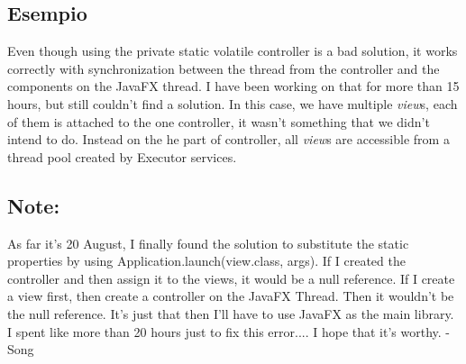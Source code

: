 \documentclass[a4paper,12pt]{report}
\begin{document}
\subsection*{Esempio}

Even though using the private static volatile controller is a bad solution, it works correctly with synchronization between the thread from the controller and the components on the JavaFX thread. 
I have been working on that for more than 15 hours, but still couldn't find a solution. In this case, we have multiple \textit{view}s, each of them is attached to the one controller, it wasn't something that we didn't intend to do.
Instead on the he part of controller, all \textit{view}s are accessible from a thread pool created by Executor services. 

\subsection*{Note:}
As far it's 20 August, I finally found the solution to substitute the static properties by using Application.launch(view.class, args). If I created the controller and then assign it to the views, it would be a null reference. If I create a view first, then create a controller on the JavaFX Thread. Then it wouldn't be the null reference. It's just that then I'll have to use JavaFX as the main library.
I spent like more than 20 hours just to fix this error.... I hope that it's worthy. -Song
\end{document}
